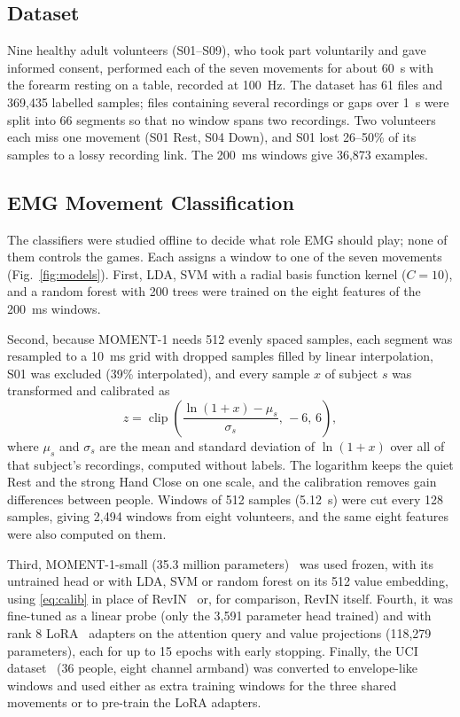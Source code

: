 \documentclass[10pt,a4paper,twocolumn]{article}
\begin{document}
\subsection{Dataset}\label{ss:data}

Nine healthy adult volunteers (S01--S09), who took part voluntarily and gave informed consent, performed each of the seven movements for about 60~s with the forearm resting on a table, recorded at 100~Hz. The dataset has 61 files and 369,435 labelled samples; files containing several recordings or gaps over 1~s were split into 66 segments so that no window spans two recordings. Two volunteers each miss one movement (S01 Rest, S04 Down), and S01 lost 26--50\% of its samples to a lossy recording link. The 200~ms windows give 36,873 examples.

\subsection{EMG Movement Classification}\label{ss:models}

The classifiers were studied offline to decide what role EMG should play; none of them controls the games. Each assigns a window to one of the seven movements (Fig.~\ref{fig:models}). First, LDA, SVM with a radial basis function kernel ($C=10$), and a random forest with 200 trees were trained on the eight features of the 200~ms windows.

Second, because MOMENT-1 needs 512 evenly spaced samples, each segment was resampled to a 10~ms grid with dropped samples filled by linear interpolation, S01 was excluded (39\% interpolated), and every sample $x$ of subject $s$ was transformed and calibrated as
\begin{equation}\label{eq:calib}
z = \operatorname{clip}\!\left(\frac{\ln(1+x) - \mu_s}{\sigma_s},\,-6,\,6\right),
\end{equation}
where $\mu_s$ and $\sigma_s$ are the mean and standard deviation of $\ln(1+x)$ over all of that subject's recordings, computed without labels. The logarithm keeps the quiet Rest and the strong Hand Close on one scale, and the calibration removes gain differences between people. Windows of 512 samples (5.12~s) were cut every 128 samples, giving 2,494 windows from eight volunteers, and the same eight features were also computed on them.

Third, MOMENT-1-small (35.3 million parameters)~\cite{goswami2024} was used frozen, with its untrained head or with LDA, SVM or random forest on its 512 value embedding, using \eqref{eq:calib} in place of RevIN~\cite{kim2022} or, for comparison, RevIN itself. Fourth, it was fine-tuned as a linear probe (only the 3,591 parameter head trained) and with rank 8 LoRA~\cite{hu2022} adapters on the attention query and value projections (118,279 parameters), each for up to 15 epochs with early stopping. Finally, the UCI dataset~\cite{lobov2018} (36 people, eight channel armband) was converted to envelope-like windows and used either as extra training windows for the three shared movements or to pre-train the LoRA adapters.
\end{document}
